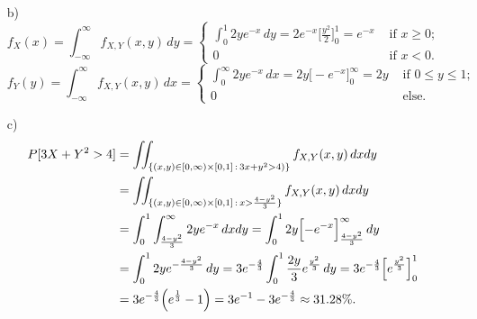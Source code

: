 \documentclass{article}
\begin{document}
\begin{enumerate}
\begin{itemize}
		\item[b)] 
		\[
		f_X(x) = \int_{-\infty}^\infty f_{X,Y}(x,y) \, dy = \left\{ \begin{array}{ll} \int_0^1 2y e^{-x} \, dy = 2 e^{-x}\bigl[\frac{y^2}{2}\bigr]_0^1 = e^{-x} & \mbox{ if } x \geq 0; \\ 0 & \mbox{ if } x < 0. \end{array}\right. 
		\]
		\[
		f_Y(y) = \int_{-\infty}^\infty f_{X,Y}(x,y) \, dx = \left\{ \begin{array}{ll} \int_0^\infty 2y e^{-x} \, dx = 2 y \bigl[- e^{-x}\bigr]_0^\infty = 2y & \mbox{ if } 0  \leq y \leq 1; \\ 0 & \mbox{ else. } \end{array}\right.
		\]
		\item[c)]
		\begin{align*}
		P[3X+ Y^2 > 4] & = \iint_{\{(x,y)\in [0,\infty) \times [0,1]\, :\, 3x+ y^2 > 4)\}}  f_{X,Y}(x,y) \, dxdy \\ & = \iint_{\{(x,y)\in [0,\infty) \times [0,1]\, :\, x > \frac{4- y^2}{3}\}}  f_{X,Y}(x,y) \, dxdy \\ & =\int_0^1 \int_{\frac{4- y^2}{3}}^\infty 2y e^{-x} \, dx dy = \int_0^1  2y \Bigl[- e^{-x}\Bigr]_{\frac{4- y^2}{3}}^\infty \, dy \\
		& =  \int_0^1  2y e^{-\frac{4- y^2}{3}} \, dy  =  3 e^{-\frac{4}{3}}\int_0^1  \frac{2y}{3} e^{\frac{y^2}{3}} \, dy   =3 e^{-\frac{4}{3}}\Bigl[  e^{\frac{y^2}{3}}\Bigr]_0^1 \\
		& =3 e^{-\frac{4}{3}}\Bigl(  e^{\frac{1}{3}} -1\Bigr) = 3 e^{-1} - 3e^{-\frac{4}{3}} \approx 31.28\%.
		\end{align*}
	\end{itemize}

\end{enumerate}
\end{document}
